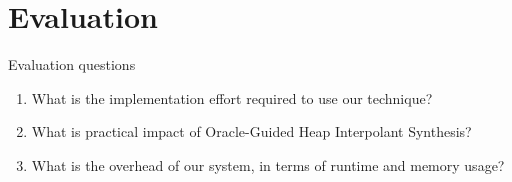 \section{Evaluation}
\label{sec:eval}

Evaluation questions

\begin{enumerate}
\item What is the implementation effort required to use our technique?
\item What is practical impact of Oracle-Guided Heap Interpolant Synthesis?
\item What is the overhead of our system, in terms of runtime and memory usage?
\end{enumerate}

